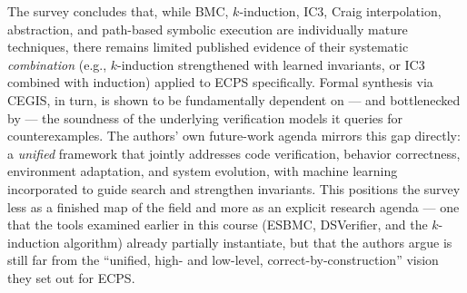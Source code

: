 \documentclass[12pt,a4paper]{article}
\begin{document}
The survey concludes that, while BMC, $k$-induction, IC3, Craig interpolation, abstraction, and
path-based symbolic execution are individually mature techniques, there remains limited
published evidence of their systematic \emph{combination} (e.g., $k$-induction strengthened
with learned invariants, or IC3 combined with induction) applied to ECPS specifically. Formal
synthesis via CEGIS, in turn, is shown to be fundamentally dependent on --- and bottlenecked by
--- the soundness of the underlying verification models it queries for counterexamples. The
authors' own future-work agenda mirrors this gap directly: a \emph{unified} framework that
jointly addresses code verification, behavior correctness, environment adaptation, and system
evolution, with machine learning incorporated to guide search and strengthen invariants. This
positions the survey less as a finished map of the field and more as an explicit research
agenda --- one that the tools examined earlier in this course (ESBMC, DSVerifier, and the
$k$-induction algorithm) already partially instantiate, but that the authors argue is still far
from the ``unified, high- and low-level, correct-by-construction'' vision they set out for ECPS.
\end{document}
